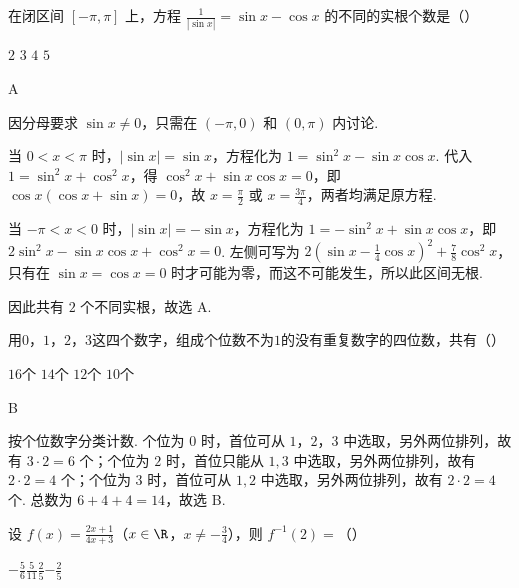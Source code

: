 \begin{problem}

在闭区间 \([-\pi, \pi] \) 上，方程 \(\frac{1}{|\sin x|} = \sin x - \cos x \) 的不同的实根个数是（\quad）

\choices
{\(2\)}
{\(3\)}
{\(4\)}
{\(5\)}
\end{problem}

\begin{answer}
A
\end{answer}

\begin{solution}
因分母要求 \(\sin x\neq0\)，只需在 \((-\pi,0)\) 和 \((0,\pi)\) 内讨论.

当 \(0<x<\pi\) 时，\(|\sin x|=\sin x\)，方程化为
\(1=\sin^{2}x-\sin x\cos x\). 代入 \(1=\sin^{2}x+\cos^{2}x\)，得 \(\cos^{2}x+\sin x\cos x=0\)，即 \(\cos x(\cos x+\sin x)=0\)，故 \(x=\frac{\pi}{2}\) 或 \(x=\frac{3\pi}{4}\)，两者均满足原方程.

当 \(-\pi<x<0\) 时，\(|\sin x|=-\sin x\)，方程化为
\(1=-\sin^{2}x+\sin x\cos x\)，即
\(2\sin^{2}x-\sin x\cos x+\cos^{2}x=0\). 左侧可写为 \(2\left(\sin x-\frac{1}{4}\cos x\right)^{2}+\frac{7}{8}\cos^{2}x\)，只有在 \(\sin x=\cos x=0\) 时才可能为零，而这不可能发生，所以此区间无根.

因此共有 \(2\) 个不同实根，故选 A.
\end{solution}

\begin{problem}

用\(0\)，\(1\)，\(2\)，\(3\)这四个数字，组成个位数不为\(1\)的没有重复数字的四位数，共有（\quad）

\choices
{\(16\)个}
{\(14\)个}
{\(12\)个}
{\(10\)个}
\end{problem}

\begin{answer}
B
\end{answer}

\begin{solution}
按个位数字分类计数. 个位为 \(0\) 时，首位可从 \(1\)，\(2\)，\(3\) 中选取，另外两位排列，故有 \(3\cdot2=6\) 个；个位为 \(2\) 时，首位只能从 \(1,3\) 中选取，另外两位排列，故有 \(2\cdot2=4\) 个；个位为 \(3\) 时，首位可从 \(1,2\) 中选取，另外两位排列，故有 \(2\cdot2=4\) 个. 总数为 \(6+4+4=14\)，故选 B.
\end{solution}

\begin{problem}

设 \(f(x)=\frac{2x+1}{4x+3}\)（\(x\in\R\)，\(x\neq-\frac{3}{4}\)），则 \(f^{-1}(2)=\)（\quad）

\choices
{\(-\frac{5}{6}\)}{\(\frac{5}{11}\)}{\(\frac{2}{5}\)}{\(-\frac{2}{5}\)}
\end{problem}

